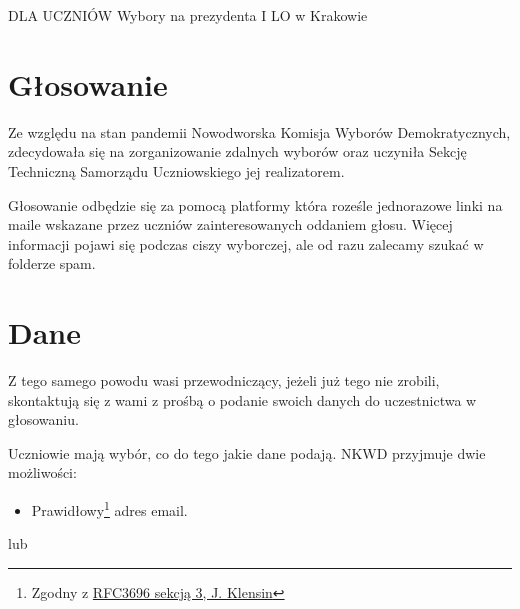 \pagestyle{fancy}


\unappendix

\begin{center}
  \LARGE{ \textsc{DLA UCZNIÓW}}
  \vspace{0.3cm}
  \hline
  \vspace{1.2cm}
  Wybory na prezydenta I LO w Krakowie
  \vspace{0.8cm}
\end{center}

\section{Głosowanie}
\normalsize
\normalshape

\hspace{0.5cm} Ze względu na stan pandemii Nowodworska Komisja Wyborów Demokratycznych, zdecydowała się na zorganizowanie zdalnych wyborów oraz uczyniła Sekcję Techniczną Samorządu Uczniowskiego jej realizatorem. \par
Głosowanie odbędzie się za pomocą platformy która roześle jednorazowe linki na maile wskazane przez uczniów zainteresowanych oddaniem głosu. Więcej informacji pojawi się podczas ciszy wyborczej, ale od razu zalecamy szukać w folderze spam.

\section{Dane}

\hspace{0.5cm} Z tego samego powodu wasi przewodniczący, jeżeli już tego nie zrobili, skontaktują się z wami z prośbą o podanie swoich danych do uczestnictwa w głosowaniu.\par
\vspace{0.3cm}
Uczniowie mają wybór, co do tego jakie dane podają. NKWD przyjmuje dwie możliwości:

\begin{itemize}
  \item Prawidłowy\footnote{Zgodny z \href{https://tools.ietf.org/html/rfc3696}{RFC3696 sekcją 3, J. Klensin}} adres email.
\end{itemize}

\vspace{-0.3cm}
\hspace{1cm} lub
\vspace{-0.3cm}

